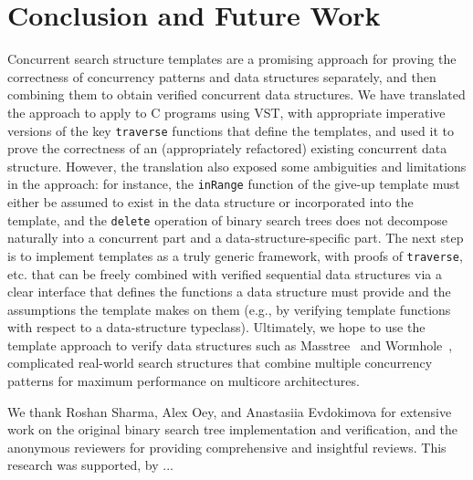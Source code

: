 \documentclass[sigplan,screen]{acmart}
\newcommand{\wm}[1]{\textbf{\textcolor{violet}{[William: #1]}}}
\begin{document}



\section{Conclusion and Future Work}
Concurrent search structure templates are a promising approach for proving the correctness of concurrency patterns and data structures separately, and then combining them to obtain verified concurrent data structures. We have translated the approach to apply to C programs using VST, with appropriate imperative versions of the key \lstinline{traverse} functions that define the templates, and used it to prove the correctness of an (appropriately refactored) existing concurrent data structure. However, the translation also exposed some ambiguities and limitations in the approach: for instance, the \lstinline{inRange} function of the give-up template must either be assumed to exist in the data structure or incorporated into the template, and the \lstinline{delete} operation of binary search trees does not decompose naturally into a concurrent part and a data-structure-specific part.  %
The next step is to implement templates as a truly generic framework, with proofs of \lstinline{traverse}, etc. that can be freely combined with verified sequential data structures via a clear interface that defines the functions a data structure must provide and the assumptions the template makes on them (e.g., by verifying template functions with respect to a data-structure typeclass).
Ultimately, we hope to use the template approach to verify data structures such as Masstree~\cite{masstree} and Wormhole~\cite{wormhole}, complicated real-world search structures that combine multiple concurrency patterns for maximum performance on multicore architectures.



\begin{acks}
We thank Roshan Sharma, Alex Oey, and Anastasiia Evdokimova for extensive work on the original binary search tree implementation and verification, and the anonymous reviewers for providing comprehensive and insightful reviews.
This research was supported, by ... 
\end{acks}

\end{document}
